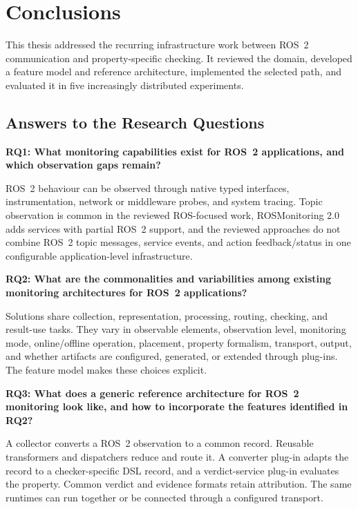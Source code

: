 \chapter{Conclusions}\label{chapter:conclusions}

This thesis addressed the recurring infrastructure work between ROS~2
communication and property-specific checking. It reviewed the domain, developed
a feature model and reference architecture, implemented the selected path, and
evaluated it in five increasingly distributed experiments.

\section{Answers to the Research Questions}

\textbf{RQ1: What monitoring capabilities exist for ROS~2 applications, and
which observation gaps remain?}

ROS~2 behaviour can be observed through native typed interfaces,
instrumentation, network or middleware probes, and system tracing. Topic
observation is common in the reviewed ROS-focused work, ROSMonitoring 2.0 adds
services with partial ROS~2 support, and the reviewed approaches do not combine
ROS~2 topic messages, service events, and action feedback/status in one
configurable application-level infrastructure.

\textbf{RQ2: What are the commonalities and variabilities among existing
monitoring architectures for ROS~2 applications?}

Solutions share collection, representation, processing, routing, checking, and
result-use tasks. They vary in observable elements, observation level,
monitoring mode, online/offline operation, placement, property formalism,
transport, output, and whether artifacts are configured, generated, or
extended through plug-ins. The feature model makes these choices explicit.

\textbf{RQ3: What does a generic reference architecture for ROS~2 monitoring
look like, and how to incorporate the features identified in RQ2?}

A collector converts a ROS~2 observation to a common record. Reusable
transformers and dispatchers reduce and route it. A converter plug-in adapts the
record to a checker-specific DSL record, and a verdict-service plug-in evaluates
the property. Common verdict and evidence formats retain attribution. The same
runtimes can run together or be connected through a configured transport.

